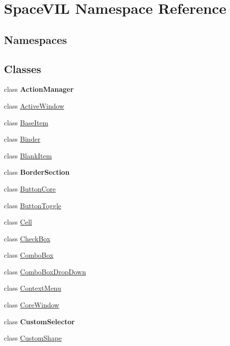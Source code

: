 \hypertarget{namespace_space_v_i_l}{}\section{Space\+V\+IL Namespace Reference}
\label{namespace_space_v_i_l}
\subsection*{Namespaces}
\begin{DoxyCompactItemize}
\end{DoxyCompactItemize}
\subsection*{Classes}
\begin{DoxyCompactItemize}
\item 
class {\bfseries Action\+Manager}
\item 
class \mbox{\hyperlink{class_space_v_i_l_1_1_active_window}{Active\+Window}}
\item 
class \mbox{\hyperlink{class_space_v_i_l_1_1_base_item}{Base\+Item}}
\item 
class \mbox{\hyperlink{class_space_v_i_l_1_1_binder}{Binder}}
\item 
class \mbox{\hyperlink{class_space_v_i_l_1_1_blank_item}{Blank\+Item}}
\item 
class {\bfseries Border\+Section}
\item 
class \mbox{\hyperlink{class_space_v_i_l_1_1_button_core}{Button\+Core}}
\item 
class \mbox{\hyperlink{class_space_v_i_l_1_1_button_toggle}{Button\+Toggle}}
\item 
class \mbox{\hyperlink{class_space_v_i_l_1_1_cell}{Cell}}
\item 
class \mbox{\hyperlink{class_space_v_i_l_1_1_check_box}{Check\+Box}}
\item 
class \mbox{\hyperlink{class_space_v_i_l_1_1_combo_box}{Combo\+Box}}
\item 
class \mbox{\hyperlink{class_space_v_i_l_1_1_combo_box_drop_down}{Combo\+Box\+Drop\+Down}}
\item 
class \mbox{\hyperlink{class_space_v_i_l_1_1_context_menu}{Context\+Menu}}
\item 
class \mbox{\hyperlink{class_space_v_i_l_1_1_core_window}{Core\+Window}}
\item 
class {\bfseries Custom\+Selector}
\item 
class \mbox{\hyperlink{class_space_v_i_l_1_1_custom_shape}{Custom\+Shape}}

\end{DoxyCompactItemize}
